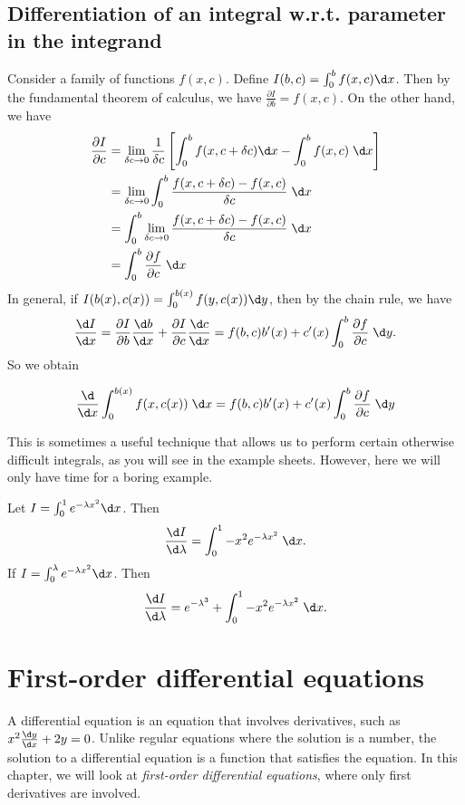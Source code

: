 \documentclass[a4paper]{article}
\begin{document}
\subsection{Differentiation of an integral w.r.t. parameter in the integrand}
Consider a family of functions $f(x, c)$. Define $I(b, c) = \int_0^bf(x, c)\d x$. Then by the fundamental theorem of calculus, we have $\frac{\partial I}{\partial b} = f(x, c)$. On the other hand, we have
\begin{align*}
  \frac{\partial I}{\partial c} &= \lim_{\delta c\to 0}\frac{1}{\delta c}\left[\int_0^bf(x, c + \delta c)\d x - \int_0^b f(x, c)\;\d x\right]\\
  &= \lim_{\delta c\to 0}\int_0^b\frac{f(x, c + \delta c) - f(x, c)}{\delta c}\;\d x\\
  &= \int_0^b\lim_{\delta c\to 0}\frac{f(x, c + \delta c) - f(x, c)}{\delta c}\;\d x\\
  &= \int_0^b\frac{\partial f}{\partial c}\;\d x
\end{align*}
In general, if $I(b(x), c(x)) = \int_0^{b(x)} f(y, c(x))\d y$, then by the chain rule, we have
\[
  \frac{\d I}{\d x} = \frac{\partial I}{\partial b}\frac{\d b}{\d x} + \frac{\partial I}{\partial c}\frac{\d c}{\d x} = f(b, c)b'(x) + c'(x) \int_0^b\frac{\partial f}{\partial c}\;\d y.
\]
So we obtain

\begin{thm}
  \[
    \frac{\d}{\d x} \int_{0}^{b(x)} f(x, c(x))\;\d x= f(b, c)b'(x) + c'(x)\int_0^b \frac{\partial f}{\partial c}\;\d y
  \]
\end{thm}
This is sometimes a useful technique that allows us to perform certain otherwise difficult integrals, as you will see in the example sheets. However, here we will only have time for a boring example.

\begin{eg}
  Let $I = \int_0^1 e^{-\lambda x^2}\d x$. Then
  \[
    \frac{\d I}{\d \lambda} = \int_0^1-x^2e^{-\lambda x^2}\;\d x.
  \]
  If $I = \int_0^\lambda e^{-\lambda x^2}\d x$. Then
  \[
    \frac{\d I}{\d \lambda} = e^{-\lambda^3} + \int_0^1-x^2e^{-\lambda x^2}\;\d x.
  \]
\end{eg}

\section{First-order differential equations}
A differential equation is an equation that involves derivatives, such as $x^2\frac{\d y}{\d x} + 2y = 0$. Unlike regular equations where the solution is a number, the solution to a differential equation is a function that satisfies the equation. In this chapter, we will look at \emph{first-order differential equations}, where only first derivatives are involved.
\end{document}
